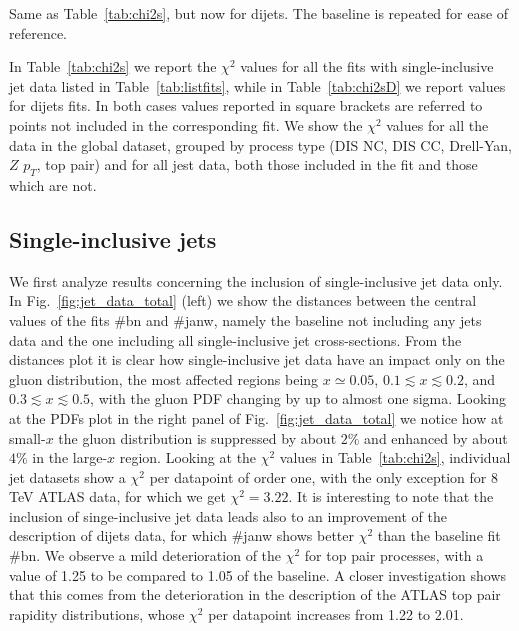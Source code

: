 \begin{table}[t]
    \renewcommand*{\arraystretch}{1.60}
    \scriptsize
    \centering
    
    \vspace{0.3cm}
    \caption{Same as Table~\ref{tab:chi2s}, but now for dijets. The
      baseline is repeated for ease of reference.}
    \label{tab:chi2sD}
\end{table}


%
In Table~\ref{tab:chi2s} we report the $\chi^2$ values for all the fits with single-inclusive jet data listed in 
Table~\ref{tab:listfits}, while in Table~\ref{tab:chi2sD} we report values for dijets fits.
In both cases values reported in square brackets are referred to points not included in the corresponding fit. 
We show the $\chi^2$ values for all the data in the global dataset, grouped by process type 
(DIS NC, DIS CC, Drell-Yan, $Z\,\,p_T$, top pair) and for all jest data, both those included in the fit 
and those which are not.
 

\subsection{Single-inclusive jets}
\label{sec:single_jet}
We first analyze results concerning the inclusion of single-inclusive jet data only.
In Fig.~\ref{fig:jet_data_total} (left) we show the distances between the central values of the fits \#bn and \#janw, 
namely the baseline not including any jets data and the one including all single-inclusive jet cross-sections.
From the distances plot it is clear how single-inclusive jet data have an impact only on the gluon distribution,
the most affected regions being $x\simeq 0.05$, $0.1\lesssim x \lesssim 0.2$, and
$0.3\lesssim x\lesssim 0.5$, with the gluon PDF changing by up to almost one sigma. 
Looking at the PDFs plot in the right panel of Fig.~\ref{fig:jet_data_total} we notice how at small-$x$ 
the gluon distribution is suppressed by about $2\%$ and enhanced by about $4\%$ in the large-$x$ region.
%
Looking at the $\chi^2$ values in Table~\ref{tab:chi2s}, individual jet datasets show a $\chi^2$ per datapoint 
of order one, with the only exception for 8 TeV ATLAS data, for which we get $\chi^2 = 3.22$.
It is interesting to note that the inclusion of singe-inclusive jet data leads also to an improvement 
of the description of dijets data, for which \#janw shows better $\chi^2$ than the baseline fit \#bn.
%   
We observe a mild deterioration of the $\chi^2$ for top pair processes, with a value of 1.25 to be compared to
1.05 of the baseline. A closer investigation shows that this comes from the deterioration in the description 
of the ATLAS top pair rapidity distributions, whose $\chi^2$ per datapoint increases from 1.22 to 2.01.

